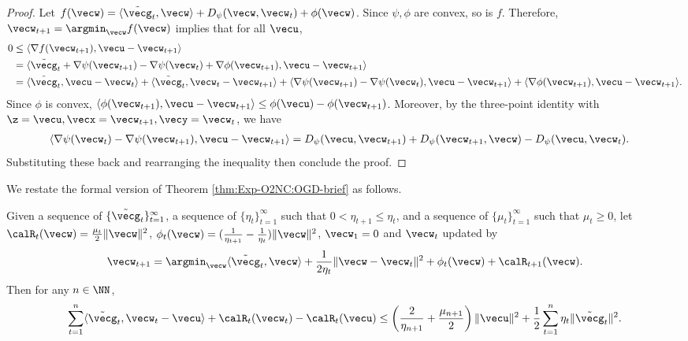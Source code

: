 \begin{proof}
Let $f(\vecw) = \langle \tilde\vecg_t,\vecw\rangle + D_\psi(\vecw,\vecw_t) + \phi(\vecw)$. Since $\psi, \phi$ are convex, so is $f$. Therefore, $\vecw_{t+1} = \argmin_\vecw f(\vecw)$ implies that for all $\vecu$,
\begin{align*}
    0 
    &\le \langle \nabla f(\vecw_{t+1}), \vecu-\vecw_{t+1}\rangle \\
    &= \langle \tilde\vecg_t + \nabla\psi(\vecw_{t+1}) - \nabla\psi(\vecw_t) + \nabla\phi(\vecw_{t+1}), \vecu-\vecw_{t+1}\rangle \\
    &= \langle\tilde\vecg_t, \vecu-\vecw_t\rangle + \langle\tilde\vecg_t,\vecw_t-\vecw_{t+1}\rangle + \langle \nabla\psi(\vecw_{t+1})-\nabla\psi(\vecw_t),\vecu-\vecw_{t+1}\rangle + \langle\nabla \phi(\vecw_{t+1}),\vecu-\vecw_{t+1}\rangle.
\end{align*}
Since $\phi$ is convex, $\langle \phi(\vecw_{t+1}),\vecu-\vecw_{t+1}\rangle \le \phi(\vecu)-\phi(\vecw_{t+1})$. Moreover, by the three-point identity with $\z=\vecu, \vecx=\vecw_{t+1}, \vecy=\vecw_t$, we have
\begin{align*}
    \langle \nabla\psi(\vecw_t) - \nabla\psi(\vecw_{t+1}),\vecu-\vecw_{t+1}\rangle 
    &= D_\psi(\vecu,\vecw_{t+1}) + D_\psi(\vecw_{t+1},\vecw) - D_\psi(\vecu,\vecw_t).
\end{align*}
Substituting these back and rearranging the inequality then conclude the proof.
\end{proof}

We restate the formal version of Theorem \ref{thm:Exp-O2NC:OGD-brief} as follows.

\begin{theorem}
\label{thm:Exp-O2NC:OGD-formal}
Given a sequence of $\{\tilde\vecg_t\}_{t=1}^\infty$, a sequence of $\{\eta_t\}_{t=1}^\infty$ such that $0<\eta_{t+1} \le \eta_t$, and a sequence of $\{\mu_t\}_{t=1}^\infty$ such that $\mu_t\ge 0$, let $\calR_t(\vecw)=\frac{\mu_t}{2}\|\vecw\|^2$, $\phi_t(\vecw)=(\frac{1}{\eta_{t+1}}-\frac{1}{\eta_t})\|\vecw\|^2$, $\vecw_1=0$ and $\vecw_t$ updated by
\begin{equation*}
    \vecw_{t+1} = \argmin_\vecw \langle \tilde\vecg_t,\vecw\rangle + \frac{1}{2\eta_t}\|\vecw-\vecw_t\|^2 + \phi_t(\vecw) + \calR_{t+1}(\vecw).
\end{equation*}
Then for any $n\in \NN$,
\begin{equation*}
    \sum_{t=1}^n \langle \tilde\vecg_t, \vecw_t-\vecu\rangle + \calR_t(\vecw_t) - \calR_t(\vecu) 
    \le \left(\frac{2}{\eta_{n+1}} + \frac{\mu_{n+1}}{2}\right)\|\vecu\|^2 + \frac{1}{2}\sum_{t=1}^n \eta_t\|\tilde\vecg_t\|^2.
\end{equation*}
\end{theorem}

